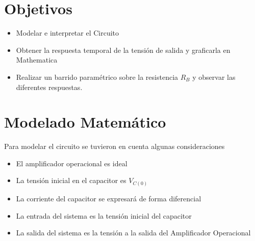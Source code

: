 \documentclass[10pt,a4paper]{article} %
\begin{document}

\section{Objetivos}
\begin{itemize}
    \item Modelar e interpretar el Circuito
    \item Obtener la respuesta temporal de la tensión de salida y graficarla en Mathematica
    \item Realizar un barrido paramétrico sobre la resistencia $R_B$ y observar las diferentes respuestas.
\end{itemize}

\section{Modelado Matemático}
Para modelar el circuito se tuvieron en cuenta algunas consideraciones

\begin{itemize}
    \item El amplificador operacional es ideal
    \item La tensión inicial en el capacitor es $V_{C(0)}$
    \item La corriente del capacitor se expresará de forma diferencial
    \item La entrada del sistema es la tensión inicial del capacitor
    \item La salida del sistema es la tensión a la salida del Amplificador Operacional
\end{itemize}
\end{document}
